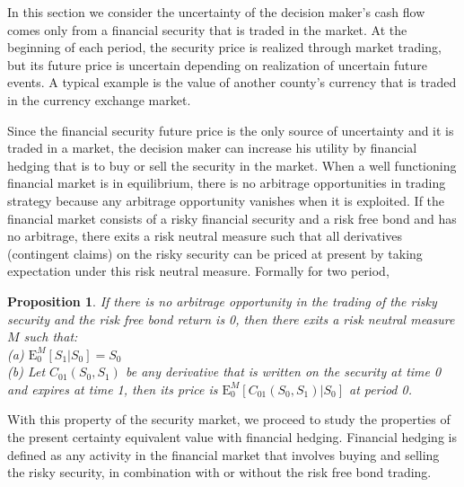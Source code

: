 \documentclass{article}[12pt letter]
\newtheorem{proposition}[theorem]{Proposition}
\newcommand{\E}{\mathrm{E}}
\begin{document}
In this section we consider the uncertainty of the decision maker's cash flow comes only from a financial security that is traded in the market. At the beginning of each period, the security price is realized through market trading, but its future price is uncertain depending on realization of uncertain future events. A typical example is the value of another county's currency that is traded in the currency exchange market. 

Since the financial security future price is the only source of uncertainty and it is traded in a market, the decision maker can increase his utility by financial hedging that is to buy or sell the security in the market.  When a well functioning financial market is in equilibrium, there is no arbitrage opportunities in trading strategy because any arbitrage opportunity vanishes when it is exploited. If the financial market consists of a risky financial security and a risk free bond and has no arbitrage, there exits a risk neutral measure such that all derivatives (contingent claims) on the risky security can be priced at present by taking expectation under this risk neutral measure. Formally for two period,    
\begin{proposition}
If there is no arbitrage opportunity in the trading of the risky security and the risk free bond return is 0, then there exits a risk neutral measure $M$ such that:\\
(a) $\E_0^M [S_1|S_0] = S_0 $ \\
(b) Let $C_{01}(S_0,S_1)$ be any derivative that is written on the security at time 0 and expires at time 1, then its price is $\E_0^M[C_{01}(S_0,S_1)|S_0]$ at period 0.
\end{proposition}

With this property of the security market, we proceed to study the properties of the present certainty equivalent value with financial hedging. Financial hedging is defined as any activity in the financial market that involves buying and selling the risky security, in combination with or without the risk free bond trading.
\end{document}
